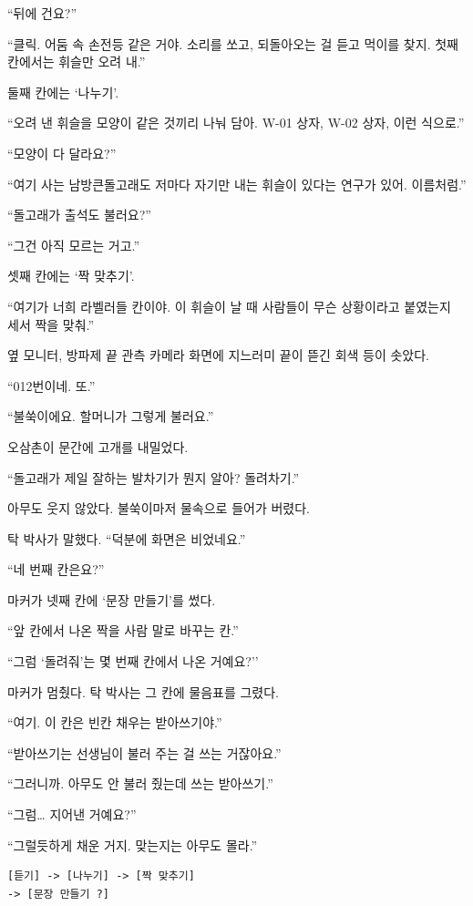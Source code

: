 \documentclass[
  korean,
  letterpaper,
  twoside,
  open=any,
  fontsize=12.5pt,
  headings=small]{scrbook}
\newcommand{\logfont}{\linespread{1}\fontsize{10.8}{15.2}\selectfont}
\begin{document}
``뒤에 건요?''

``클릭. 어둠 속 손전등 같은
거야. 소리를 쏘고, 되돌아오는
걸 듣고 먹이를 찾지. 첫째
칸에서는 휘슬만 오려 내.''

둘째 칸에는 `나누기'.

``오려 낸 휘슬을 모양이 같은
것끼리 나눠 담아. W-01 상자,
W-02 상자, 이런 식으로.''

``모양이 다 달라요?''

``여기 사는 남방큰돌고래도
저마다 자기만 내는 휘슬이
있다는 연구가 있어.
이름처럼.''

``돌고래가 출석도 불러요?''

``그건 아직 모르는 거고.''

셋째 칸에는 `짝 맞추기'.

``여기가 너희 라벨러들 칸이야.
이 휘슬이 날 때 사람들이 무슨
상황이라고 붙였는지 세서 짝을
맞춰.''

옆 모니터, 방파제 끝 관측
카메라 화면에 지느러미 끝이
뜯긴 회색 등이 솟았다.

``012번이네. 또.''

``불쑥이에요. 할머니가 그렇게
불러요.''

오삼촌이 문간에 고개를
내밀었다.

``돌고래가 제일 잘하는
발차기가 뭔지 알아?
돌려차기.''

아무도 웃지 않았다. 불쑥이마저
물속으로 들어가 버렸다.

탁 박사가 말했다. ``덕분에
화면은 비었네요.''

``네 번째 칸은요?''

마커가 넷째 칸에 `문장
만들기'를 썼다.

``앞 칸에서 나온 짝을 사람
말로 바꾸는 칸.''

``그럼 `돌려줘'는 몇 번째
칸에서 나온 거예요?''

마커가 멈췄다. 탁 박사는 그
칸에 물음표를 그렸다.

``여기. 이 칸은 빈칸 채우는
받아쓰기야.''

``받아쓰기는 선생님이 불러
주는 걸 쓰는 거잖아요.''

``그러니까. 아무도 안 불러
줬는데 쓰는 받아쓰기.''

``그럼\ldots{} 지어낸
거예요?''

``그럴듯하게 채운 거지.
맞는지는 아무도 몰라.''

\begin{Verbatim}[samepage=true,frame=single,framesep=2.5mm,rulecolor=\color{gray},formatcom=\logfont]
[듣기] -> [나누기] -> [짝 맞추기]
-> [문장 만들기 ?]
\end{Verbatim}
\end{document}
